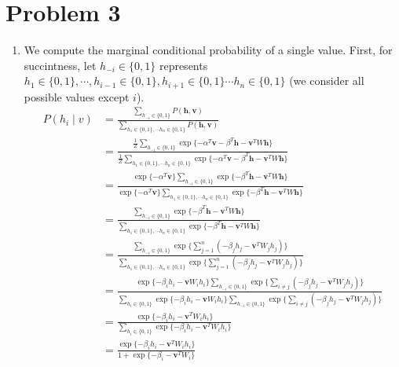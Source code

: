 \documentclass[12pt]{article}
\begin{document}
\pagebreak
\section*{Problem 3}

\begin{enumerate}[label=(\alph*)]
\item We compute the marginal conditional probability of a single value. First, for succintness, let $h_{-i} \in \{0,1\}$ represents $h_1 \in \{0,1\}, \cdots, h_{i-1} \in \{0,1\}, h_{i+1}\in \{0,1\} \cdots h_n \in \{0,1\}$ (we consider all possible values except $i$).
\begin{align*}
P(h_i \mid v) &= \frac{\sum_{h_{-i} \in \{0,1\}} P(\textbf{h}, \textbf{v})}{\sum_{h_1 \in \{0,1\}, \cdots h_n \in \{0,1\}} P(\textbf{h}, \textbf{v})} \\
&= \frac{\frac{1}{Z}\sum_{h_{-i} \in \{0,1\}} \exp\{-\alpha^T\textbf{v} - \beta^T \textbf{h} - \textbf{v}^TW\textbf{h}\}}{\frac{1}{Z}\sum_{h_1 \in \{0,1\}, \cdots h_n \in \{0,1\}} \exp\{-\alpha^T\textbf{v} - \beta^T \textbf{h} - \textbf{v}^TW\textbf{h}\}} \\
&= \frac{\exp\{-\alpha^T \textbf{v}\}\sum_{h_{-i} \in \{0,1\}} \exp\{- \beta^T \textbf{h} - \textbf{v}^TW\textbf{h}\}}{\exp\{-\alpha^T \textbf{v}\}\sum_{h_1 \in \{0,1\}, \cdots h_n \in \{0,1\}} \exp\{- \beta^T \textbf{h} - \textbf{v}^TW\textbf{h}\}} \\
&= \frac{\sum_{h_{-i} \in \{0,1\}} \exp\{- \beta^T \textbf{h} - \textbf{v}^TW\textbf{h}\}}{\sum_{h_1 \in \{0,1\}, \cdots h_n \in \{0,1\}} \exp\{- \beta^T \textbf{h} - \textbf{v}^TW\textbf{h}\}} \\
&= \frac{\sum_{h_{-i} \in \{0,1\}} \exp\{\sum_{j = 1 }^n (-\beta_j h_j - \textbf{v}^TW_jh_j)\}}{\sum_{h_1 \in \{0,1\}, \cdots h_n \in \{0,1\}} \exp\{\sum_{j = 1 }^n (-\beta_j h_j - \textbf{v}^TW_jh_j)\}} \\
&= \frac{\exp\{-\beta_i h_i - \textbf{v}W_ih_i\}\sum_{h_{-i} \in \{0,1\}} \exp\{\sum_{i \neq j } (-\beta_j h_j - \textbf{v}^TW_jh_j)\}}{\sum_{h_i \in \{0,1\}}\exp\{-\beta_i h_i - \textbf{v}W_ih_i\} \sum_{h_{-i} \in \{0,1\}} \exp\{\sum_{i \neq j} (-\beta_j h_j - \textbf{v}^TW_jh_j)\}} \\
&= \frac{\exp\{-\beta_i h_i - \textbf{v}^TW_ih_i\}}{\sum_{h_i \in \{0,1\}}\exp\{-\beta_i h_i - \textbf{v}^TW_ih_i\}} \\
&= \frac{\exp\{-\beta_i h_i - \textbf{v}^TW_ih_i\}}{1 + \exp\{-\beta_i - \textbf{v}^TW_i\}}
\end{align*}


\end{enumerate}
\end{document}
